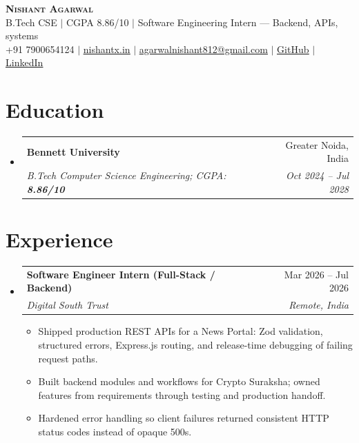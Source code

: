 \documentclass[letterpaper,11pt]{article}
\makeatletter
\newcommand{\resumeItem}[1]{
  \item\small{
    {#1 \vspace{-5pt}}
  }
}
\newcommand{\resumeSubheading}[4]{
  \vspace{-2pt}\item
    \begin{tabular*}{0.97\textwidth}[t]{l@{\extracolsep{\fill}}r}
      \textbf{#1} & #2 \\
      \textit{\small#3} & \textit{\small #4} \\
    \end{tabular*}\vspace{-9pt}
}
\newcommand{\resumeSubHeadingListStart}{\begin{itemize}[leftmargin=0.15in, label={}]}
\newcommand{\resumeSubHeadingListEnd}{\end{itemize}}
\newcommand{\resumeItemListStart}{\begin{itemize}}
\newcommand{\resumeItemListEnd}{\end{itemize}\vspace{-10pt}}
\makeatother
\begin{document}
\begin{center}
  \textbf{\Huge \scshape Nishant Agarwal} \\ \vspace{1pt}
  \small B.Tech CSE $|$ CGPA 8.86/10 $|$ Software Engineering Intern --- Backend, APIs, systems \\ \vspace{1pt}
  \small +91 7900654124 $|$
  \href{https://nishantx.in}{\underline{nishantx.in}} $|$
  \href{mailto:agarwalnishant812@gmail.com}{\underline{agarwalnishant812@gmail.com}} $|$
  \href{https://github.com/nishant-uxs}{\underline{GitHub}} $|$
  \href{https://www.linkedin.com/in/nishant-agarwal-62a956322/}{\underline{LinkedIn}}
\end{center}

\section{Education}
  \resumeSubHeadingListStart
    \resumeSubheading
      {Bennett University}{Greater Noida, India}
      {B.Tech Computer Science Engineering; CGPA: \textbf{8.86/10}}{Oct 2024 -- Jul 2028}
  \resumeSubHeadingListEnd

\section{Experience}
  \resumeSubHeadingListStart
    \resumeSubheading
      {Software Engineer Intern (Full-Stack / Backend)}{Mar 2026 -- Jul 2026}
      {Digital South Trust}{Remote, India}
      \resumeItemListStart
        \resumeItem{Shipped production REST APIs for a News Portal: Zod validation, structured errors, Express.js routing, and release-time debugging of failing request paths.}
        \resumeItem{Built backend modules and workflows for Crypto Suraksha; owned features from requirements through testing and production handoff.}
        \resumeItem{Hardened error handling so client failures returned consistent HTTP status codes instead of opaque 500s.}
      \resumeItemListEnd
  \resumeSubHeadingListEnd
\end{document}
